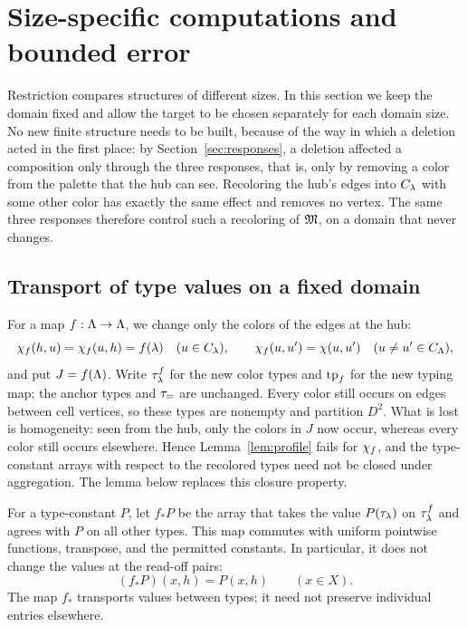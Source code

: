 \section{Size-specific computations and bounded error}\label{sec:robustness}
Restriction compares structures of different sizes. In this section we keep
the domain fixed and allow the target to be chosen separately for each
domain size. No new finite structure needs to be built, because of the way
in which a deletion acted in the first place: by
Section~\ref{sec:responses}, a deletion affected a composition only through
the three responses, that is, only by removing a color from the palette
that the hub can see. Recoloring the hub's edges into $C_{\lambda}$ with
some other color has exactly the same effect and removes no vertex. The
same three responses therefore control such a recoloring of $\mathfrak M$, on a
domain that never changes.

\subsection{Transport of type values on a fixed domain}
For a map $f:\Lambda\to\Lambda$, we change only the colors of the edges at the
hub:
\[
 \chi_f(h,u)=\chi_f(u,h)=f(\lambda)\quad(u\in C_{\lambda}),\qquad
 \chi_f(u,u')=\chi(u,u')\quad(u\ne u'\in C_{\Lambda}),
\]
and put $J=f(\Lambda)$. Write $\tau_{\lambda}^f$ for the new color types and
$\operatorname{tp}_f$ for the new typing map; the anchor types and $\tau_{=}$ are unchanged.
Every color still occurs on edges between cell vertices, so these types are
nonempty and partition $D^2$. What is lost is homogeneity: seen from the
hub, only the colors in $J$ now occur, whereas every color still occurs
elsewhere. Hence Lemma~\ref{lem:profile} fails for $\chi_f$, and the
type-constant arrays with respect to the recolored types need not be closed
under aggregation. The lemma below replaces this closure property.

For a type-constant $P$, let $f_\ast P$ be the array that takes the value
$P(\tau_{\lambda})$ on $\tau_{\lambda}^f$ and agrees with $P$ on all other
types. This map commutes with uniform pointwise functions, transpose, and
the permitted constants. In particular, it does not change the values at
the read-off pairs:
\begin{equation}\label{eq:transport-anchor}
 (f_\ast P)(x,h)=P(x,h)\qquad(x\in X).
\end{equation}
The map $f_\ast$ transports values between types; it need not preserve
individual entries elsewhere.

